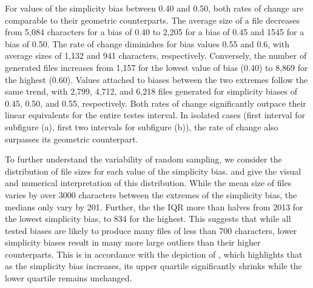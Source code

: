 For values of the simplicity bias between 0.40 and 0.50, both rates of change
are comparable to their geometric counterparts.
The average size of a file decreases from 5,084 characters for a bias of 0.40
to 2,205 for a bias of 0.45 and 1545 for a bias of 0.50.
The rate of change diminishes for bias values 0.55 and 0.6, with
average sizes of 1,132 and 941 characters, respectively.
Conversely, the number of generated files increases from 
1,157 for the lowest value of bias (0.40) to 8,869 for the highest (0.60).
Values attached to biases between the two extremes follow the same trend,
with 2,799, 4,712, and 6,218 files generated for simplicity biases of
0.45, 0.50, and 0.55, respectively.
Both rates of change significantly outpace their linear equivalents for the entire testes interval.
In isolated cases (first interval for subfigure (a), first two intervals for subfigure (b)),
the rate of change also surpasses its geometric counterpart.

To further understand the variability of random sampling, we consider
the distribution of file sizes for each value of the simplicity bias.
 and  give the
visual and numerical interpretation of this distribution.
While the mean size of files varies by over 3000 characters between the
extremes of the simplicity bias, the medians only vary by 201.
Further, the the \gls{IQR} more than halves from 2013 for the lowest
simplicity bias, to 834 for the highest.
This suggests that while all tested biases are likely to produce
many files of less than 700 characters, lower simplicity biases
result in many more large outliers than their higher counterparts.
This is in accordance with the depiction of ,
which highlights that as the simplicity bias increases, its upper quartile
significantly shrinks while the lower quartile remains unchanged.

